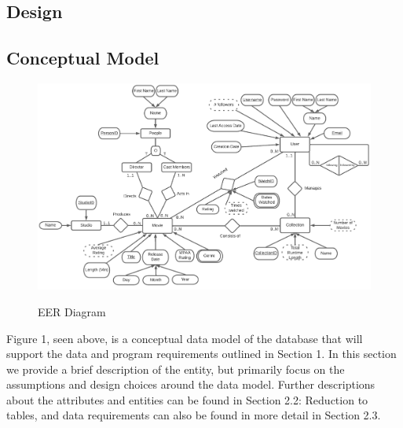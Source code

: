 \documentclass[12pt]{article}
\begin{document}
    \begin{landscape}
        \section{Design}

        \subsection{Conceptual Model}
        \begin{figure}[h]
            \begin{center}
                \includegraphics[scale=0.5]{images/Movies EER diagram.pdf}
                \label{EER Label}
                \caption {EER Diagram}
            \end{center}
        \end{figure}
    \end{landscape}


    Figure 1, seen above, is a conceptual data model of the database that will support the data and program requirements outlined in Section 1. In this section we provide a brief description of the entity, but primarily focus on the assumptions and design choices around the data model. Further descriptions about the attributes and entities can be found in Section 2.2: Reduction to tables, and data requirements can also be found in more detail in Section 2.3.
\end{document}
